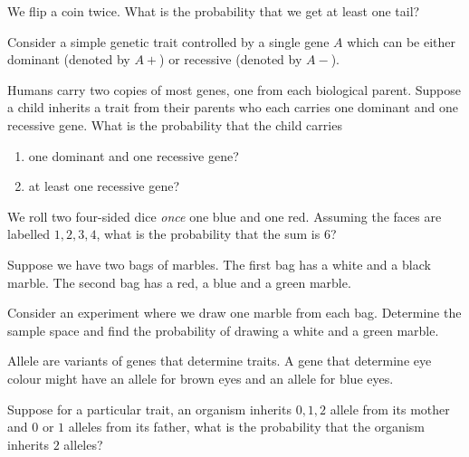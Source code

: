 \documentclass[../main.tex]{subfiles}
\begin{document}
\begin{example}
  We flip a coin twice.  What is the probability that we get at least one tail?
\end{example}

\begin{example}
  Consider a simple genetic trait controlled by a single gene \(A\) which can be either dominant (denoted by \(A+\)) or recessive (denoted by \(A-\)).

  Humans carry two copies of most genes, one from each biological parent. Suppose a child inherits a trait from their parents who each carries one dominant and one recessive gene. What is the probability that the child carries
  \begin{enumerate}
    \item one dominant and one recessive gene?
    \item at least one recessive gene?
  \end{enumerate}

\end{example}
\clearpage

\begin{example}
  We roll two four-sided dice \emph{once} one blue and one red.  Assuming the faces are labelled \(1,2,3,4\), what is the probability that the sum is \(6\)?

\end{example}

\begin{example}
  Suppose we have two bags of marbles.  The first bag has a white and a black marble.  The second bag has a red, a blue and a green marble.

  Consider an experiment where we draw one marble from each bag.  Determine the sample space and find the probability of drawing a white and a green marble. 

\end{example}

\begin{example}
  Allele are variants of genes that determine traits.  A gene that determine eye colour might have an allele for brown eyes and an allele for blue eyes.  

  Suppose for a particular trait, an organism inherits \(0,1,2\) allele from its mother and \(0\) or \(1\) alleles from its father, what is the probability that the organism inherits \(2\) alleles?

\end{example}
\clearpage
\end{document}
